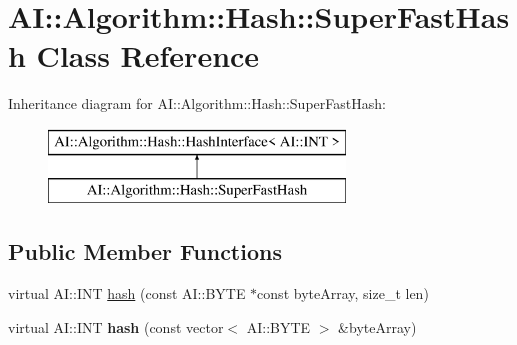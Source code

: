 \hypertarget{classAI_1_1Algorithm_1_1Hash_1_1SuperFastHash}{\section{A\-I\-:\-:Algorithm\-:\-:Hash\-:\-:Super\-Fast\-Hash Class Reference}
\label{classAI_1_1Algorithm_1_1Hash_1_1SuperFastHash}
}
Inheritance diagram for A\-I\-:\-:Algorithm\-:\-:Hash\-:\-:Super\-Fast\-Hash\-:\begin{figure}[H]
\begin{center}
\leavevmode
\includegraphics[height=2.000000cm]{classAI_1_1Algorithm_1_1Hash_1_1SuperFastHash}
\end{center}
\end{figure}
\subsection*{Public Member Functions}
\begin{DoxyCompactItemize}
\item 
virtual A\-I\-::\-I\-N\-T \hyperlink{classAI_1_1Algorithm_1_1Hash_1_1SuperFastHash_a242ccb7975bd45b30a945d9649170629}{hash} (const A\-I\-::\-B\-Y\-T\-E $\ast$const byte\-Array, size\-\_\-t len)
\item 
\hypertarget{classAI_1_1Algorithm_1_1Hash_1_1SuperFastHash_a08a5db31d857cc7706529d185827586a}{virtual A\-I\-::\-I\-N\-T {\bfseries hash} (const vector$<$ A\-I\-::\-B\-Y\-T\-E $>$ \&byte\-Array)}\label{classAI_1_1Algorithm_1_1Hash_1_1SuperFastHash_a08a5db31d857cc7706529d185827586a}

\end{DoxyCompactItemize}


